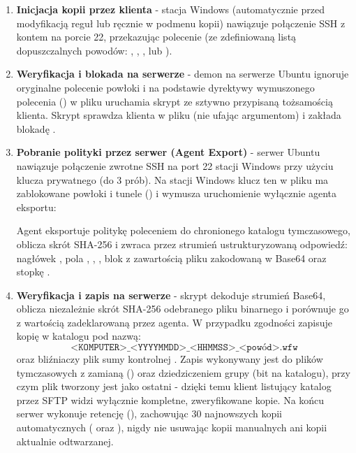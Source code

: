 \begin{enumerate}
    \item \textbf{Inicjacja kopii przez klienta} - stacja Windows (automatycznie przed modyfikacją reguł lub ręcznie w podmenu kopii) nawiązuje połączenie SSH z kontem  na porcie 22, przekazując polecenie  (ze zdefiniowaną listą dopuszczalnych powodów: , , ,  lub ).
    \item \textbf{Weryfikacja i blokada na serwerze} - demon  na serwerze Ubuntu ignoruje oryginalne polecenie powłoki i na podstawie dyrektywy wymuszonego polecenia () w pliku  uruchamia skrypt  ze sztywno przypisaną tożsamością klienta. Skrypt sprawdza klienta w pliku  (nie ufając argumentom) i zakłada blokadę .
    \item \textbf{Pobranie polityki przez serwer (Agent Export)} - serwer Ubuntu nawiązuje połączenie zwrotne SSH na port 22 stacji Windows przy użyciu klucza prywatnego  (do 3 prób). Na stacji Windows klucz ten w pliku  ma zablokowane powłoki i tunele () i wymusza uruchomienie wyłącznie agenta eksportu:
    \begin{center}
    \end{center}
    Agent eksportuje politykę poleceniem  do chronionego katalogu tymczasowego, oblicza skrót SHA-256 i zwraca przez strumień  ustrukturyzowaną odpowiedź: nagłówek , pola , , , blok  z zawartością pliku  zakodowaną w Base64 oraz stopkę .
    \item \textbf{Weryfikacja i zapis na serwerze} - skrypt  dekoduje strumień Base64, oblicza niezależnie skrót SHA-256 odebranego pliku binarnego i porównuje go z wartością zadeklarowaną przez agenta. W przypadku zgodności zapisuje kopię w katalogu  pod nazwą:
    \[
        \texttt{<KOMPUTER>\_<YYYYMMDD>\_<HHMMSS>\_<powód>.wfw}
    \]
    oraz bliźniaczy plik sumy kontrolnej . Zapis wykonywany jest do plików tymczasowych  z zamianą () oraz dziedziczeniem grupy  (bit   na katalogu), przy czym plik  tworzony jest jako ostatni - dzięki temu klient listujący katalog przez SFTP widzi wyłącznie kompletne, zweryfikowane kopie. Na końcu serwer wykonuje retencję (), zachowując 30 najnowszych kopii automatycznych ( oraz ), nigdy nie usuwając kopii manualnych ani kopii aktualnie odtwarzanej.
\end{enumerate}


